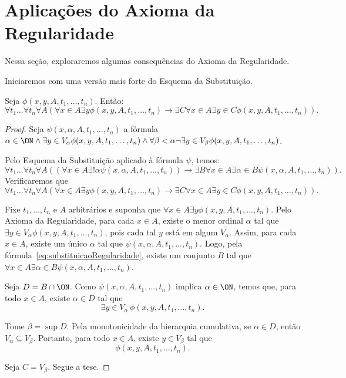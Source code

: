 \section{Aplicações do Axioma da Regularidade}
Nessa seção, exploraremos algumas consequências do Axioma da Regularidade.

Iniciaremos com uma versão mais forte do Esquema da Substituição.
\begin{theorem}[$\ZF$]
    Seja $\phi(x, y, A, t_1, \ldots, t_n)$.
    Então:
    \[
        \forall t_1\ldots \forall t_n \forall A \left( \forall x\in A \exists y \phi(x, y, A, t_1, \ldots, t_n) \rightarrow \exists C \forall x\in A \exists y\in C \phi(x, y, A, t_1, \ldots, t_n) \right).
    \]
\end{theorem}
\begin{proof}
    Seja $\psi(x, \alpha, A, t_1, \ldots, t_n)$ a fórmula $\alpha \in \ON \land \exists y \in V_\alpha \phi(x, y, A, t_1, \ldots, t_n) \land \forall \beta<\alpha \neg \exists y \in V_\beta \phi(x, y, A, t_1, \ldots, t_n)$.
    
    Pelo Esquema da Substituição aplicado à fórmula $\psi$, temos:
    \begin{equation}\label{eq:substituicaoRegularidade}
        \forall t_1\ldots \forall t_n \forall A \left( (\forall x\in A \exists!\alpha \psi(x, \alpha, A, t_1, \ldots, t_n)) \rightarrow \exists B \forall x\in A \exists \alpha \in B \psi(x, \alpha, A, t_1, \ldots, t_n) \right).
    \end{equation}
    Verificaremos que
    \[
        \forall t_1\ldots \forall t_n \forall A \left( \forall x\in A \exists y \phi(x, y, A, t_1, \ldots, t_n) \rightarrow \exists C \forall x\in A \exists y\in C \phi(x, y, A, t_1, \ldots, t_n) \right).
    \]

    Fixe $t_1, \ldots, t_n$ e $A$ arbitrários e suponha que $\forall x\in A \exists y \phi(x, y, A, t_1, \ldots, t_n)$.
    Pelo Axioma da Regularidade, para cada $x\in A$, existe o menor ordinal $\alpha$ tal que $\exists y \in V_\alpha \phi(x, y, A, t_1, \ldots, t_n)$, pois cada tal $y$ está em algum $V_\alpha$.
    Assim, para cada $x\in A$, existe um único $\alpha$ tal que $\psi(x, \alpha, A, t_1, \ldots, t_n)$.
    Logo, pela fórmula~\eqref{eq:substituicaoRegularidade}, existe um conjunto $B$ tal que $\forall x\in A \exists \alpha \in B \psi(x, \alpha, A, t_1, \ldots, t_n)$.

    Seja $D=B\cap \ON$.
    Como $\psi(x,\alpha,A,t_1,\ldots,t_n)$ implica $\alpha\in\ON$, temos que, para todo $x\in A$, existe $\alpha\in D$ tal que
    \[
        \exists y\in V_\alpha\,\phi(x,y,A,t_1,\ldots,t_n).
    \]

    Tome $\beta=\sup D$.
    Pela monotonicidade da hierarquia cumulativa, se $\alpha\in D$, então $V_\alpha\subseteq V_\beta$.
    Portanto, para todo $x\in A$, existe $y\in V_\beta$ tal que
    \[
        \phi(x,y,A,t_1,\ldots,t_n).
    \]

    Seja $C=V_\beta$.
    Segue a tese.
\end{proof}

